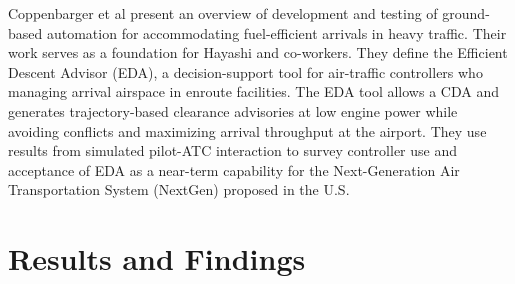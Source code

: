 \documentclass{aer1315-pretty}
\begin{document}
Coppenbarger et al \cite{Copp:2010b} present an overview of development and testing of ground-based automation for accommodating fuel-efficient arrivals in heavy traffic. Their work serves as a foundation for Hayashi and co-workers\cite{Hayashi:2011}. They define the Efficient Descent Advisor (EDA), a decision-support tool for air-traffic controllers who managing arrival airspace in enroute facilities. The EDA tool allows a CDA and generates trajectory-based clearance advisories at low engine power while avoiding conflicts and maximizing arrival throughput at the airport. They use results from simulated pilot-ATC interaction to survey controller use and acceptance of EDA as a near-term capability for the Next-Generation Air Transportation System (NextGen) proposed in the U.S. \par


\section{Results and Findings} \label{sec:results}
\end{document}

